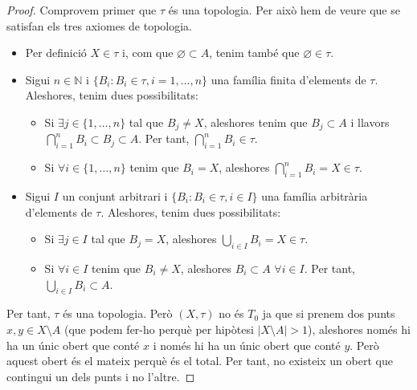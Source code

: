 \documentclass[10pt,a4paper]{article}
\theoremstyle{definition}
\newcommand{\NN}{\ensuremath{\mathbb{N}}}
\begin{document}
\begin{proof}
      Comprovem primer que $\tau$ és una topologia. Per això hem de veure que se satisfan els tres axiomes de topologia.
      \begin{itemize}
            \item Per definició $X\in\tau$ i, com que $\varnothing\subset A$, tenim també que $\varnothing\in\tau$.
            \item Sigui $n\in\NN$ i $\{B_i:B_i\in\tau, i=1,\ldots,n\}$ una família finita d'elements de $\tau$. Aleshores, tenim dues possibilitats:
                  \begin{itemize}
                        \item Si $\exists j\in\{1,\ldots,n\}$ tal que $B_j\ne X$, aleshores tenim que $B_j\subset A$ i llavors $\bigcap_{i=1}^nB_i\subset B_j\subset A$. Per tant, $\bigcap_{i=1}^nB_i\in\tau$.
                        \item Si $\forall i\in\{1,\ldots,n\}$ tenim que $B_i= X$, aleshores $\bigcap_{i=1}^nB_i=X\in\tau$.
                  \end{itemize}
            \item Sigui $I$ un conjunt arbitrari i $\{B_i:B_i\in\tau, i\in I\}$ una família arbitrària d'elements de $\tau$. Aleshores, tenim dues possibilitats:
                  \begin{itemize}
                        \item Si $\exists j\in I$ tal que $B_j=X$, aleshores $\bigcup_{i\in I}B_i=X\in\tau$.
                        \item Si $\forall i\in I$ tenim que $B_i\ne X$, aleshores $B_i\subset A$ $\forall i\in I$. Per tant, $\bigcup_{i\in I}B_i\subset A$.
                  \end{itemize}
      \end{itemize}
      Per tant, $\tau$ és una topologia. Però $(X,\tau)$ no és $T_0$ ja que si prenem dos punts $x,y\in X\setminus A$ (que podem fer-ho perquè per hipòtesi $|X\setminus A|>1$), aleshores només hi ha un únic obert que conté $x$ i només hi ha un únic obert que conté $y$. Però aquest obert és el mateix perquè és el total. Per tant, no existeix un obert que contingui un dels punts i no l'altre.
\end{proof}
\end{document}
